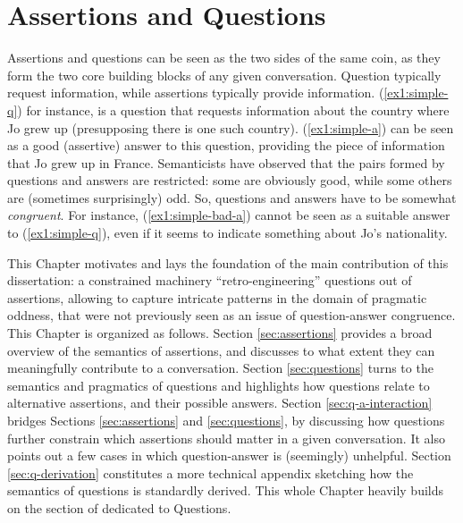 \chapter{Assertions and Questions}\label{chap:introduction}

Assertions and questions can be seen as the two sides of the same coin, as they form the two core building blocks of any given conversation. Question typically request information, while assertions typically provide information. (\ref{ex1:simple-q}) for instance, is a question that requests information about the country where Jo grew up (presupposing there is one such country). (\ref{ex1:simple-a}) can be seen as a good (assertive) answer to this question, providing the piece of information that Jo grew up in France. Semanticists have observed that the pairs formed by questions and answers are restricted: some are obviously good, while some others are (sometimes surprisingly) odd. So, questions and answers have to be somewhat \textit{congruent}. For instance, (\ref{ex1:simple-bad-a}) cannot be seen as a suitable answer to (\ref{ex1:simple-q}), even if it seems to indicate something about Jo's nationality.

\begin{exe}
	\ex\label{ex1:simple-q-a}
	\begin{xlist}
		\label{ex1:simple-q}
		\label{ex1:simple-a}
		\label{ex1:simple-bad-a}
	\end{xlist}
\end{exe}

This Chapter motivates and lays the foundation of the main contribution of this dissertation: a constrained machinery ``retro-engineering'' questions out of assertions, allowing to capture intricate patterns in the domain of pragmatic oddness, that were not previously seen as an issue of question-answer congruence. This Chapter is organized as follows. Section \ref{sec:assertions} provides a broad overview of the semantics of assertions, and discusses to what extent they can meaningfully contribute to a conversation. Section \ref{sec:questions} turns to the semantics and pragmatics of questions and highlights how questions relate to alternative assertions, and their possible answers. Section \ref{sec:q-a-interaction} bridges Sections \ref{sec:assertions} and \ref{sec:questions}, by discussing how questions further constrain which assertions should matter in a given conversation. It also points out a few cases in which question-answer is (seemingly) unhelpful. Section \ref{sec:q-derivation} constitutes a more technical appendix sketching how the semantics of questions is standardly derived. This whole Chapter heavily builds on the section of \citet{Heim2023} dedicated to Questions.


